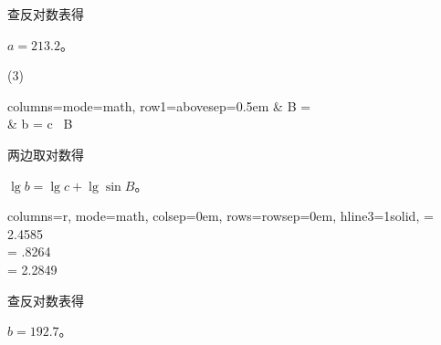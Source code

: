 查反对数表得

\hspace*{2em} $a = 213.2$。


(3) \begin{tblr}[t]{columns={mode=math}, row{1}={abovesep=0.5em}}
    \because   & \sin B =  \douhao \\
    \therefore & b = c \, \sin B \juhao \\
\end{tblr}

两边取对数得

\hspace*{2em} $\lg b = \lg c + \lg \sin B$。

\hspace*{2em} \begin{tblr}[t]{
    columns={r, mode=math, colsep=0em},
    rows={rowsep=0em},
    hline{3}={1}{solid},
}
     = 2.4585 \\
     = .8264  \\
     = 2.2849
\end{tblr}

查反对数表得

\hspace*{2em} $b = 192.7$。




